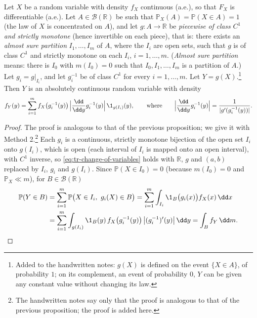 \begin{corollary}\label{cor:tr-piecewise}
Let $X$ be a random variable with density $f_X$ continuous (a.e.), so that $F_X$ is
differentiable (a.e.). Let $A\in\mathcal B(\mathbb R)$ be such that $\mathbb P_X(A)=\mathbb
P(X\in A)=1$ (the law of $X$ is concentrated on $A$), and let $g:A\to\mathbb R$ be \emph{piecewise
of class $C^1$ and strictly monotone} (hence invertible on each piece), that is: there exists an
\emph{almost sure partition} $I_1,\dots,I_m$ of $A$, where the $I_i$ are open sets, such that $g$
is of class $C^1$ and strictly monotone on each $I_i$, $i=1,\dots,m$. (\emph{Almost sure partition}
means: there is $I_0$ with $m(I_0)=0$ such that $I_0,I_1,\dots,I_m$ is a partition of $A$.) Let
$g_i=g|_{I_i}$, and let $g_i^{-1}$ be of class $C^1$ for every $i=1,\dots,m$. Let
$Y=g(X)$.\footnote{Added to the handwritten notes: $g(X)$ is defined on the event $\{X\in A\}$,
of probability $1$; on its complement, an event of probability $0$, $Y$ can be given any
constant value without changing its law.} Then $Y$ is an absolutely continuous random variable
with density
\[
  f_Y(y)=\sum_{i=1}^mf_X\big(g_i^{-1}(y)\big)\,\Big|\frac{\dd}{\dd y}g_i^{-1}(y)\Big|\,\1_{g(I_i)}(y),
  \qquad\text{where}\qquad\Big|\frac{\dd}{\dd y}g_i^{-1}(y)\Big|=\frac1{|g'(g_i^{-1}(y))|}.
\]
\end{corollary}

\begin{proof}
The proof is analogous to that of the previous proposition; we give it with Method
2.\footnote{The handwritten notes say only that the proof is analogous to that of the previous
proposition; the proof is added here.} Each $g_i$
is a continuous, strictly monotone bijection of the open set $I_i$ onto $g(I_i)$, which is open
(each interval of $I_i$ is mapped onto an open interval), with $C^1$ inverse, so
\eqref{eq:tr-change-of-variables} holds with $\mathbb R$, $g$ and $(a,b)$ replaced by $I_i$, $g_i$
and $g(I_i)$. Since $\mathbb P(X\in I_0)=0$ (because $m(I_0)=0$ and $\mathbb P_X\ll m$), for
$B\in\mathcal B(\mathbb R)$
\[
\begin{aligned}
  \mathbb P(Y\in B)&=\sum_{i=1}^m\mathbb P\big(X\in I_i,\ g_i(X)\in B\big)
  =\sum_{i=1}^m\int_{I_i}\1_B\big(g_i(x)\big)f_X(x)\,\dd x\\
  &=\sum_{i=1}^m\int_{g(I_i)}\1_B(y)\,f_X\big(g_i^{-1}(y)\big)\,\big|(g_i^{-1})'(y)\big|\,\dd y
  =\int_Bf_Y\,\dd m .
\end{aligned}\qedhere
\]
\end{proof}

